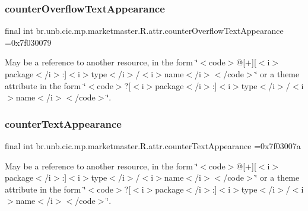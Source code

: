 \subsubsection{\texorpdfstring{counter\+Overflow\+Text\+Appearance}{counterOverflowTextAppearance}}
{\footnotesize\ttfamily final int br.\+unb.\+cic.\+mp.\+marketmaster.\+R.\+attr.\+counter\+Overflow\+Text\+Appearance =0x7f030079\hspace{0.3cm}{\ttfamily [static]}}

May be a reference to another resource, in the form \char`\"{}$<$code$>$@\mbox{[}+\mbox{]}\mbox{[}$<$i$>$package$<$/i$>$\+:\mbox{]}$<$i$>$type$<$/i$>$/$<$i$>$name$<$/i$>$$<$/code$>$\char`\"{} or a theme attribute in the form \char`\"{}$<$code$>$?\mbox{[}$<$i$>$package$<$/i$>$\+:\mbox{]}$<$i$>$type$<$/i$>$/$<$i$>$name$<$/i$>$$<$/code$>$\char`\"{}. \mbox{\label{classbr_1_1unb_1_1cic_1_1mp_1_1marketmaster_1_1R_1_1attr_a6ed38c76f04ac0416a2201c0e0dedab1}} 
\subsubsection{\texorpdfstring{counter\+Text\+Appearance}{counterTextAppearance}}
{\footnotesize\ttfamily final int br.\+unb.\+cic.\+mp.\+marketmaster.\+R.\+attr.\+counter\+Text\+Appearance =0x7f03007a\hspace{0.3cm}{\ttfamily [static]}}

May be a reference to another resource, in the form \char`\"{}$<$code$>$@\mbox{[}+\mbox{]}\mbox{[}$<$i$>$package$<$/i$>$\+:\mbox{]}$<$i$>$type$<$/i$>$/$<$i$>$name$<$/i$>$$<$/code$>$\char`\"{} or a theme attribute in the form \char`\"{}$<$code$>$?\mbox{[}$<$i$>$package$<$/i$>$\+:\mbox{]}$<$i$>$type$<$/i$>$/$<$i$>$name$<$/i$>$$<$/code$>$\char`\"{}. \mbox{\label{classbr_1_1unb_1_1cic_1_1mp_1_1marketmaster_1_1R_1_1attr_ab2e5f2be40b9c8b5974e8eb1819f6dd1}} 
